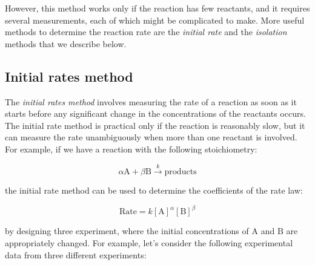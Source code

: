 \documentclass[
  9pt,
]{extbook}
\theoremstyle{definition}
\theoremstyle{definition}
\theoremstyle{definition}
\theoremstyle{definition}
\theoremstyle{remark}
\begin{document}
\normalsize

However, this method works only if the reaction has few reactants, and it requires several measurements, each of which might be complicated to make. More useful methods to determine the reaction rate are the \emph{initial rate} and the \emph{isolation} methods that we describe below.

\subsection{Initial rates method}\label{initial-rates-method}

The \emph{initial rates method} involves measuring the rate of a reaction as soon as it starts before any significant change in the concentrations of the reactants occurs. The initial rate method is practical only if the reaction is reasonably slow, but it can measure the rate unambiguously when more than one reactant is involved. For example, if we have a reaction with the following stoichiometry:

\begin{equation}
\alpha \mathrm{A} + \beta \mathrm{B} \xrightarrow{k} \text{products}
\end{equation}

the initial rate method can be used to determine the coefficients of the rate law:

\begin{equation}
\text{Rate}=k[\mathrm{A}]^{\alpha}[\mathrm{B}]^{\beta}
\label{eq:kinini1}
\end{equation}

by designing three experiment, where the initial concentrations of \(\mathrm{A}\) and \(\mathrm{B}\) are appropriately changed. For example, let's consider the following experimental data from three different experiments:
\end{document}
